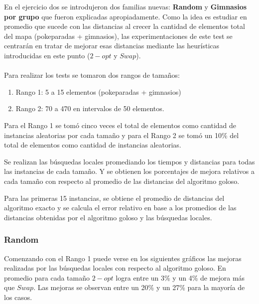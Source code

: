 \newpage

En el ejercicio dos se introdujeron dos familias nuevas: \textbf{Random} y \textbf{Gimnasios por grupo} que fueron explicadas apropiadamente. Como la idea es estudiar en promedio que sucede con las distancias al crecer la cantidad de elementos total del mapa (pokeparadas + gimnasios), las experimentaciones de este test se centrarán en tratar de mejorar esas distancias mediante las heurísticas introducidas en este punto ($2-opt$ y $Swap$).\\\\

Para realizar los tests se tomaron dos rangos de tamaños:
\begin{enumerate}
\item Rango 1: 5 a 15 elementos (pokeparadas + gimnasios)
\item Rango 2: 70 a 470 en intervalos de 50 elementos.
\end{enumerate}

Para el Rango 1 se tomó cinco veces el total de elementos como cantidad de instancias aleatorias por cada tamaño y para el Rango 2 se tomó un 10\% del total de elementos como cantidad de instancias aleatorias.

Se realizan las búsquedas locales promediando los tiempos y distancias para todas las instancias de cada tamaño. Y se obtienen los porcentajes de mejora relativos a cada tamaño con respecto al promedio de las distancias del algoritmo goloso.
 
Para las primeras 15 instancias, se obtiene el promedio de distancias del algoritmo exacto y se calcula el error relativo en base a los promedios de las distancias obtenidas por el algoritmo goloso y las búsquedas locales.

\subsubsection*{Random}

Comenzando con el Rango 1 puede verse en los siguientes gráficos las mejoras realizadas por las búsquedas locales con respecto al algoritmo goloso. En promedio para cada tamaño $2-opt$ logra entre un 3\% y un 4\% de mejora más que $Swap$. Las mejoras se observan entre un 20\% y un 27\% para la mayoría de los casos.
\\\\


